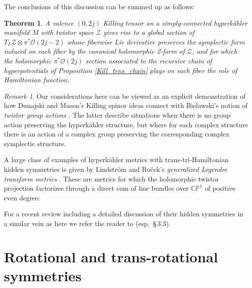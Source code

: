 \documentclass[11pt]{amsart}
\newtheorem{theorem}{Theorem}%
\theoremstyle{remark}
\newtheorem*{remark}{Remark}
\theoremstyle{remark}
\theoremstyle{definition}
\theoremstyle{definition}
\theoremstyle{definition}
\newcommand{\0}{{\scriptstyle 0'}} %
\newcommand{\1}{{\scriptstyle 1'}}
\newcommand{\I}{{\scriptscriptstyle I}} %
\newcommand{\pt}{\hspace{1pt}} %
\begin{document}
The conclusions of this discussion can be summed up as follows:

\begin{theorem} \label{Kill_spins_tw_sp}
A valence $(0,2j)$ Killing tensor on a simply-connected hyperk\"ahler manifold $M$ with twistor space $\mathcal{Z}$ gives rise to a global section of $T_F\mathcal{Z} \otimes \pi^*\mathcal{O}(2j-2)$ whose fiberwise Lie derivative preserves the symplectic form induced on each fiber by the canonical holomorphic 2-form of $\mathcal{Z}$, and for which the holomorphic $\pi^*\mathcal{O}(2j)$ section associated to the recursive chain of hyperpotentials of Proposition \ref{Kill_tens_chain} plays on each fiber the role of Hamiltonian function.
\end{theorem}

\begin{remark}
Our considerations here can be viewed as an explicit demonstration of how Dunajski and Mason's Killing spinor ideas \cite{MR1785432, MR2006758} connect with Bielawski's notion of \textit{twistor group actions} \cite{MR1848654}. The latter describe situations when there is no group action preserving the hyperk\"ahler structure, but where for each complex structure there is an action of a complex group preserving the corresponding complex symplectic structure. 
\end{remark}

A large class of examples of hyperk\"ahler metrics with trans-tri-Hamiltonian hidden symmetries is given by Lindstr\"om and Ro\v{c}ek's \textit{generalized Legendre transform metrics} \cite{MR929144}. These are metrics for which the holomorphic twistor projection factorizes through a direct sum of line bundles over $\mathbb{CP}^1$ of positive even degree:
\begin{center}
\end{center}
For a recent review including a detailed discussion of their hidden symmetries in a similar vein as here we refer the reader to \cite{MR3681388} (esp.~\S\,3.3). 






\section{Rotational and trans-rotational symmetries} \label{sec:Trans-rot}
\end{document}
